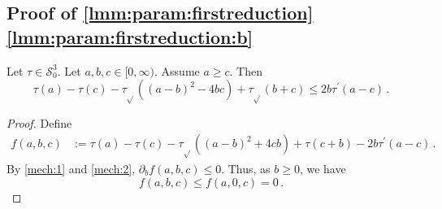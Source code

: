 \documentclass{article}
\newcommand*{\mc}[1]{\mathcal{#1}}
\newcommand{\Rp}{[0, \infty)} %
\newcommand{\pr}{^\prime}
\newcommand{\equationFullstop}{\, .}
\newcommand{\eqfs}{\equationFullstop}
\newcommand{\tran}{\tau}
\newcommand{\trans}{\tran_{\!\sqrt{}}}
\newcommand{\dtran}{\tran\pr}
\newcommand{\setccod}[1]{\mc S_0^{#1}}
\begin{document}
\begin{appendix}
\subsection{Proof of \cref{lmm:param:firstreduction} \ref{lmm:param:firstreduction:b}}\label{ssec:reduii}
%
\begin{lemma}\label{lmm:param:reduii}
	Let $\tran\in\setccod3$.
	Let $a,b,c\in\Rp$. Assume $a\geq c$. Then
	\begin{equation}
		\tran(a) - \tran(c) -\trans((a-b)^2 - 4bc) + \trans(b + c) \leq 2b \dtran(a-c)
		\eqfs
	\end{equation}
\end{lemma}
\begin{proof}
	Define
	\begin{align*}
		f(a,b,c) &:= \tran(a) - \tran(c) - \trans((a-b)^2+4cb) + \tran(c+b) - 2 b \dtran(a - c)
		\eqfs
	\end{align*}
	By \cref{mech:1} and \cref{mech:2}, $\partial_b f(a,b,c) \leq 0$. Thus, as $b\geq0$, we have 
	\begin{equation*}
		f(a,b,c) \leq f(a, 0, c) = 0
		\eqfs
	\end{equation*}
\end{proof}
%
%
%
%
%
%
%

\end{appendix}
\end{document}
